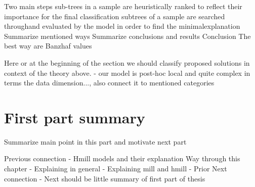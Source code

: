 
Two main steps
    sub-trees in a sample are heuristically ranked to reflect their importance for the final classification
    subtrees of a sample are searched throughand evaluated by the model in order to find the minimalexplanation
Summarize mentioned ways
Summarize conclusions and results
    Conclusion The best way are Banzhaf values

Here or at the beginning of the section we should classify proposed solutions in context of the theory above. - our model is post-hoc local and quite complex in terms the data dimension..., also connect it to mentioned categories

\section{First part summary}
Summarize main point in this part and motivate next part




Previous connection
- Hmill models and their explanation
Way through this chapter
- Explaining in general
- Explaining mill and hmill
- Prior
Next connection
- Next should be little summary of first part of thesis
